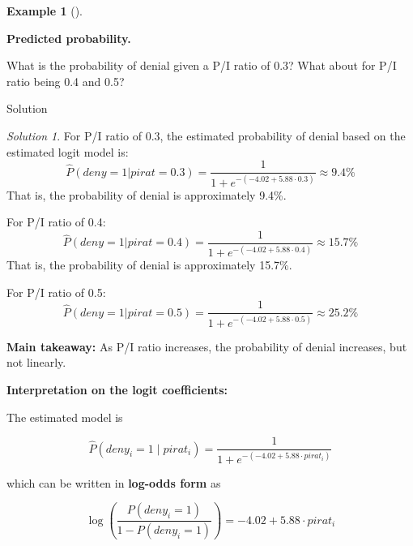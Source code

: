 \documentclass[
  12pt,
  letterpaper,
]{scrbook}
\theoremstyle{plain}
\theoremstyle{definition}
\newtheorem{example}{Example}[chapter]
\theoremstyle{remark}
\newtheorem{refsolution}{Solution}[chapter]
\begin{document}
\begin{example}[]\protect\hypertarget{exm-1}{}\label{exm-1}

\textbf{Predicted probability.}

What is the probability of denial given a P/I ratio of 0.3? What about
for P/I ratio being 0.4 and 0.5?

\end{example}

Solution

\begin{refsolution}
For P/I ratio of 0.3, the estimated probability of denial based on the
estimated logit model is: \[
\widehat{P}(deny = 1 | pirat = 0.3) = \frac{1}{1 + e^{-(-4.02 + 5.88 \cdot 0.3)}} \approx 9.4\%
\] That is, the probability of denial is approximately 9.4\%.

For P/I ratio of 0.4: \[
\widehat{P}(deny = 1 | pirat = 0.4) = \frac{1}{1 + e^{-(-4.02 + 5.88 \cdot 0.4)}} \approx 15.7\%
\] That is, the probability of denial is approximately 15.7\%.

For P/I ratio of 0.5: \[
\widehat{P}(deny = 1 | pirat = 0.5) = \frac{1}{1 + e^{-(-4.02 + 5.88 \cdot 0.5)}} \approx 25.2\%
\]

\textbf{Main takeaway:} As P/I ratio increases, the probability of
denial increases, but not linearly.

\label{sol-1}

\end{refsolution}

{\textbf{Interpretation on the logit coefficients:}}

The estimated model is

\[
\widehat{P}(deny_i = 1 \mid pirat_i) = \frac{1}{1 + e^{-(-4.02 + 5.88 \cdot pirat_i)}}
\]

which can be written in \textbf{log-odds form} as

\[
\log\left(\frac{P(deny_i = 1)}{1 - P(deny_i = 1)}\right) = -4.02 + 5.88 \cdot pirat_i
\]
\end{document}
